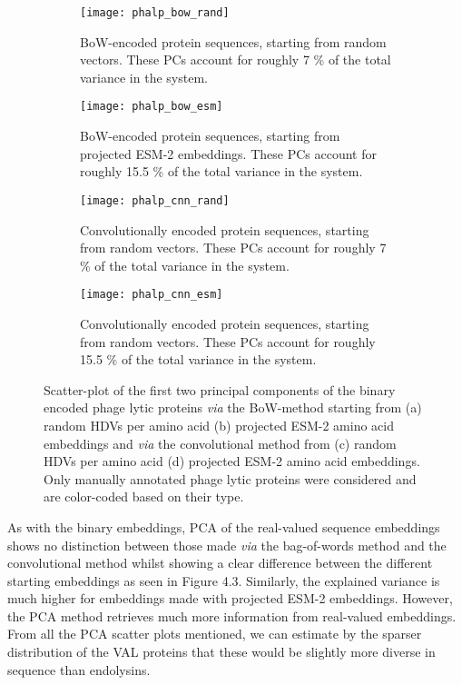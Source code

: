 \begin{figure}[h!]
    \centering
    \begin{subfigure}{0.48\textwidth}
        \texttt{[image: phalp\_bow\_rand]}
        \caption{BoW-encoded protein sequences, starting from random vectors. These PCs account for roughly 7 \% of the total variance in the system.}
    \label{fig:phalpbowrand}
    \end{subfigure}
    \hfill
    \begin{subfigure}{0.48\textwidth}
        \texttt{[image: phalp\_bow\_esm]}
        \caption{BoW-encoded protein sequences, starting from projected ESM-2 embeddings. These PCs account for roughly 15.5 \% of the total variance in the system.}
    \label{fig:phalpbowesm}
    \end{subfigure}
    
    \begin{subfigure}{0.48\textwidth}
        \texttt{[image: phalp\_cnn\_rand]}
        \caption{Convolutionally encoded protein sequences, starting from random vectors. These PCs account for roughly 7 \% of the total variance in the system.}
    \label{fig:phalpcnnrand}
    \end{subfigure}
    \hfill
    \begin{subfigure}{0.48\textwidth}
        \texttt{[image: phalp\_cnn\_esm]}
        \caption{Convolutionally encoded protein sequences, starting from random vectors. These PCs account for roughly 15.5 \% of the total variance in the system.}
    \label{fig:phalpcnnesm}
    \end{subfigure}
    \caption{Scatter-plot of the first two principal components of the binary encoded phage lytic proteins \textit{via} the BoW-method starting from (a) random HDVs per amino acid (b) projected ESM-2 amino acid embeddings and \textit{via} the convolutional method from (c) random HDVs per amino acid (d) projected ESM-2 amino acid embeddings. Only manually annotated phage lytic proteins were considered and are color-coded based on their type.}
    \label{fig:phalp_emb}
\end{figure}

As with the binary embeddings, PCA of the real-valued sequence embeddings shows no distinction between those made \textit{via} the bag-of-words method and the convolutional method whilst showing a clear difference between the different starting embeddings as seen in Figure 4.3. Similarly, the explained variance is much higher for embeddings made with projected ESM-2 embeddings. However, the PCA method retrieves much more information from real-valued embeddings. From all the PCA scatter plots mentioned, we can estimate by the sparser distribution of the VAL proteins that these would be slightly more diverse in sequence than endolysins.

